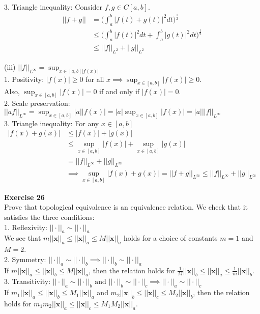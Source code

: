 \documentclass[letterpaper,12pt]{article}
\let\vec\mathbf
\theoremstyle{definition}
\begin{document}
3. Triangle inequality: Consider $f, g \in C[a, b]$.
\begin{align*}
  || f + g || &= \Big(\int_a^b |f(t) + g(t)|^2 dt\Big)^\frac{1}{2} \\
  &\leq \Big(\int_a^b |f(t)|^2dt + \int_a^b |g(t)|^2dt\Big)^\frac{1}{2} \\
  &\leq ||f||_{L^2} + ||g||_{L^2}
\end{align*}

(iii) $||f||_{L^\infty} = \sup_{x \in [a,b] |f(x)|}$ \\
1. Positivity: $|f(x)| \geq 0$ for all $x \implies \sup_{x \in [a, b]} |f(x)| \geq 0$. \\
Also, $\sup_{x \in [a, b]} |f(x)| = 0$ if and only if $|f(x)| = 0$. \\

2. Scale preservation: $||af||_{L^\infty} = \sup_{x \in [a, b]} |a||f(x)| = |a| \sup_{x \in [a, b]} |f(x)| = |a|||f||_{L^\infty}$ \\

3. Triangle inequality:
  For any $x \in [a, b]$
  \begin{align*}
    |f(x) + g(x)| &\leq |f(x)| + |g(x)| \\
    &\leq \sup_{x \in [a, b]} |f(x)| + \sup_{x \in [a, b]} |g(x)| \\
    &= ||f||_{L^\infty} + ||g||_{L^\infty} \\
    &\implies \sup_{x \in [a, b]} |f(x) + g(x)| = ||f + g ||_{L^\infty} \leq ||f||_{L^\infty} + ||g||_{L^\infty}
  \end{align*}

\textbf{Exercise 26} \\
Prove that topological equivalence is an equivalence relation. We check that it satisfies the three conditions: \\

1. Reflexivity: $||\cdot||_a \sim ||\cdot||_a$ \\
We see that $m||\vec{x}||_a \leq ||\vec{x}||_a \leq M||\vec{x}||_a$ holds for a choice of constants $m=1$ and $M=2$. \\

2. Symmetry: $||\cdot||_a \sim ||\cdot||_b \implies ||\cdot||_b \sim ||\cdot||_a$ \\
If $m||\vec{x}||_a \leq ||\vec{x}||_b \leq M||\vec{x}||_a$, then the relation holds for $\frac{1}{M}||\vec{x}||_b \leq ||\vec{x}||_a \leq \frac{1}{m}||\vec{x}||_b$. \\

3. Transitivity: $||\cdot||_a \sim ||\cdot||_b \text{ and } ||\cdot||_b \sim ||\cdot||_c \implies ||\cdot||_a \sim ||\cdot||_c$ \\
If $m_1||\vec{x}||_a \leq ||\vec{x}||_b \leq M_1||\vec{x}||_a$ and $m_2||\vec{x}||_b \leq ||\vec{x}||_c \leq M_2||\vec{x}||_b$, then the relation holds for $m_1m_2||\vec{x}||_a \leq ||\vec{x}||_c \leq M_1M_2||\vec{x}||_a$. \\
\end{document}
